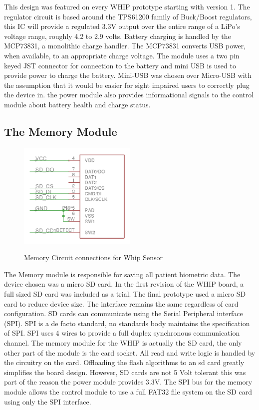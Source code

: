 This design was featured on every WHIP prototype starting with version 1. The regulator circuit is based around the TPS61200 family of Buck/Boost regulators, this IC will provide a regulated 3.3V output over the entire range of a LiPo's voltage range, roughly 4.2 to 2.9 volts. Battery charging is handled by the MCP73831, a monolithic charge handler. The MCP73831 converts USB power, when available, to an appropriate charge voltage. The module uses a two pin keyed JST connector for connection to the battery and mini USB is used to provide power to charge the battery. Mini-USB was chosen over Micro-USB with the assumption that it would be easier for sight impaired users to correctly plug the device in. the power module also provides informational signals to the control module about battery health and charge status.

\subsection {The Memory Module}
\begin{figure}
	\begin{center}
		\label{fig:Rev5_SDCARD}
		\includegraphics[scale=1,width=0.5\textwidth]{Images/Rev5_SDCARD.png} 
		\caption{Memory Circuit connections for Whip Sensor}
	\end{center}
\end{figure}
The Memory module is responsible for saving all patient biometric data. The device chosen was a micro SD card. In the first revision of the WHIP board, a full sized SD card was included as a trial. The final prototype used a micro SD card to reduce device size. The interface remains the same regardless of card configuration. SD cards can communicate using the Serial Peripheral interface (SPI). SPI is a de facto standard, no standards body maintains the specification of SPI. SPI uses 4 wires to provide a full duplex synchronous communication channel. The memory module for the WHIP is actually the SD card, the only other part of the module is the card socket. All read and write logic is handled by the circuitry on the card. Offloading the flash algorithms to an sd card greatly simplifies the board design. However, SD cards are not 5 Volt tolerant this was part of the reason the power module provides 3.3V. The SPI bus for the memory module allows the control module to use a full FAT32 file system on the SD card using only the SPI interface.

